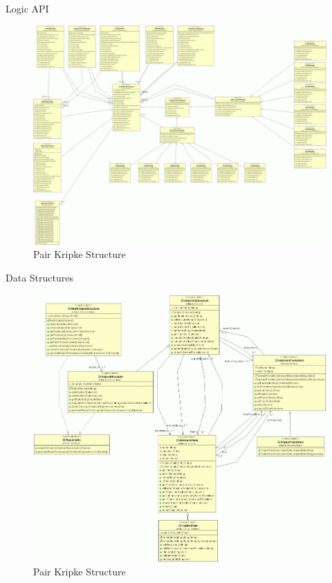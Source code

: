 \documentclass{bredelebeamer}
\begin{document}
\begin{frame}{Logic API} %
\begin{figure}
\centering
\includegraphics[scale=0.25]{logic.jpg}
\caption{Pair Kripke Structure}
\end{figure}
\end{frame}

\begin{frame}{Data Structures} %
\begin{figure}
\centering
\includegraphics[scale=0.25]{structures.jpg}
\caption{Pair Kripke Structure}
\end{figure}
\end{frame}
\end{document}
